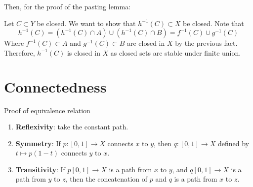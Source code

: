Then, for the proof of the pasting lemma:

\begin{myproof}
	Let $C\subset Y$ be closed. We want to show that $h^{-1}(C)\subset X$ be closed. Note that $$h^{-1}(C) = (h^{-1}(C)\cap A)\cup (h^{-1}(C)\cap B) = f^{-1}(C)\cup g^{-1}(C)$$
	Where $f^{-1}(C)\subset A$ and $g^{-1}(C)\subset B$ are closed in $X$ by the previous fact. Therefore, $h^{-1}(C)$ is closed in $X$ as closed sets are stable under finite union.
\end{myproof}


\section{Connectedness}


\begin{myproof}
	Proof of equivalence relation
	\begin{enumerate}
		\item \textbf{Reflexivity}: take the constant path.
		\item \textbf{Symmetry}: If $p:[0,1]\to X$ connects $x$ to $y$, then $q:[0,1]\to X$ defined by $t\mapsto p(1-t)$ connects $y$ to $x$.
		\item \textbf{Transitivity}: If $p[0,1]\to X$ is a path from $x$ to $y$, and $q[0,1]\to X$ is a path from $y$ to $z$, then the concatenation of $p$ and $q$ is a path from $x$ to $z$.
	\end{enumerate}
\end{myproof}



